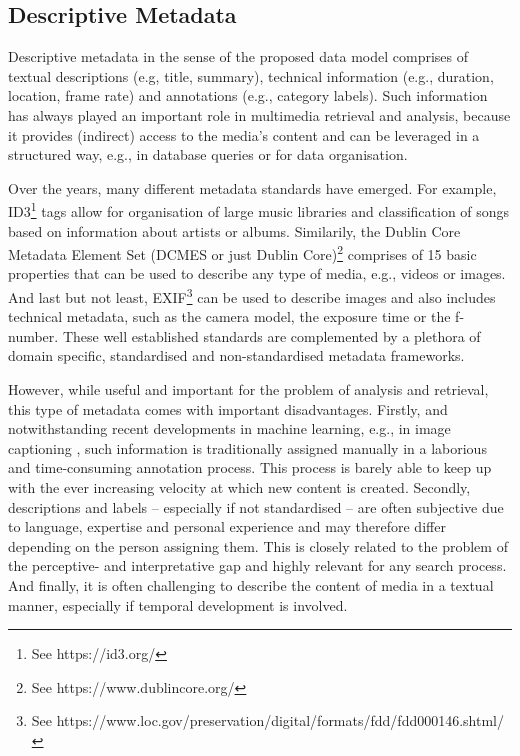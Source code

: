 \subsection{Descriptive Metadata}
Descriptive metadata in the sense of the proposed data model comprises of textual descriptions (e.g, title, summary), technical information (e.g., duration, location, frame rate) and annotations (e.g., category labels). Such information has always played an important role in multimedia retrieval and analysis, because it provides (indirect) access to the media's content and can be leveraged in a structured way, e.g., in database queries or for data organisation.

Over the years, many different metadata standards have emerged. For example, ID3\footnote{See https://id3.org/} tags allow for organisation of large music libraries and classification of songs based on information about artists or albums. Similarily, the Dublin Core Metadata Element Set (DCMES or just Dublin Core)\footnote{See https://www.dublincore.org/} comprises of 15 basic properties that can be used to describe any type of media, e.g., videos or images. And last but not least, EXIF\footnote{See https://www.loc.gov/preservation/digital/formats/fdd/fdd000146.shtml/} can be used to describe images and also includes technical metadata, such as the camera model, the exposure time or the f-number. These well established standards are complemented by a plethora of domain specific, standardised and non-standardised metadata frameworks.

However, while useful and important for the problem of analysis and retrieval, this type of metadata comes with important disadvantages. Firstly, and notwithstanding recent developments in machine learning, e.g., in image captioning \cite{Hossain:2019Comprehensive}, such information is traditionally assigned manually in a laborious and time-consuming annotation process. This process is barely able to keep up with the ever increasing velocity at which new content is created. Secondly, descriptions and labels -- especially if not standardised -- are often subjective due to language, expertise and personal experience and may therefore differ depending on the person assigning them. This is closely related to the problem of the perceptive- and interpretative gap \cite{Rossetto:2018Multi} and highly relevant for any search process. And finally, it is often challenging to describe the content of media in a textual manner, especially if temporal development is involved.

